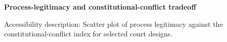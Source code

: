 \documentclass[11pt]{article}
\begin{document}
\noindent\textbf{Process-legitimacy and constitutional-conflict tradeoff}\par
\smallskip
\noindent
\par\smallskip
\noindent\footnotesize Accessibility description: Scatter plot of process legitimacy against the constitutional-conflict index for selected court designs.
\end{document}
